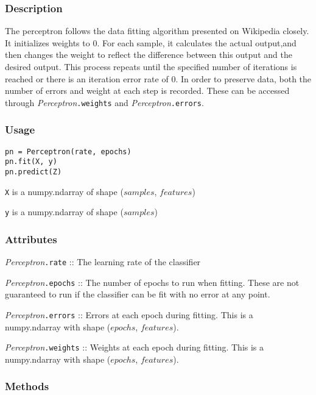 \documentclass{article}
\begin{document}
\subsubsection{Description}

The perceptron follows the data fitting algorithm presented on Wikipedia
closely. It initializes weights to 0. For each sample, it calculates the actual
output,and then changes the weight to reflect the difference between this output
and the desired output. This process repeats until the specified number of
iterations is reached or there is an iteration error rate of 0. In order to
preserve data, both the number of errors and weight at each step is recorded.
These can be accessed through \textit{Perceptron}\texttt{.weights} and
\textit{Perceptron}\texttt{.errors}.

\subsubsection{Usage}

\begin{verbatim}
pn = Perceptron(rate, epochs)
pn.fit(X, y)
pn.predict(Z)
\end{verbatim}

\texttt{X} is a numpy.ndarray of shape ($samples$, $features$)

\texttt{y} is a numpy.ndarray of shape ($samples$)

\subsubsection{Attributes}

\textit{Perceptron}\texttt{.rate} :: The learning rate of the classifier

\textit{Perceptron}\texttt{.epochs} :: The number of epochs to run when fitting. These are not guaranteed to run if the classifier can be fit with no error at any point.

\textit{Perceptron}\texttt{.errors} :: Errors at each epoch during fitting. This is a numpy.ndarray with shape ($epochs$, $features$).

\textit{Perceptron}\texttt{.weights} :: Weights at each epoch during fitting. This is a numpy.ndarray with shape ($epochs$, $features$).

\subsubsection{Methods}
\end{document}
